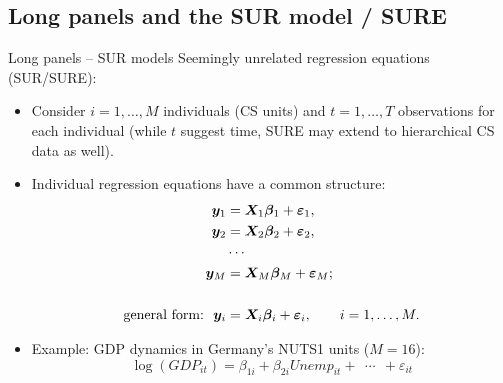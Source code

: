 \documentclass[usenames,dvipsnames]{beamer}
\begin{document}
\subsection*{Long panels and the SUR model / SURE}
\begin{frame}{Long panels -- SUR models}
\small
Seemingly unrelated regression equations (SUR/SURE):\\ \medskip
\begin{itemize}
    \item Consider $i=1,\dots,M$ individuals (CS units) and $t=1,\dots,T$ observations for each individual (while $t$ suggest time, SURE may extend to hierarchical CS data as well).\\
    \bigskip
    \item Individual regression equations have a common structure: 
    \begin{align*}
        \bm{y}_1 &= \bm{X}_1 \bm{\beta}_1 + \bm{\varepsilon}_1, \\
        \bm{y}_2 &= \bm{X}_2 \bm{\beta}_2 + \bm{\varepsilon}_2, \\
        &\cdots \\
        \bm{y}_M &= \bm{X}_M \bm{\beta}_M + \bm{\varepsilon}_M;\\
        &~ \\
        \textnormal{general form:~~} \bm{y}_i &= \bm{X}_i \bm{\beta}_i + \bm{\varepsilon}_i,\qquad i = 1,\dots,M.
    \end{align*}
    \item Example: GDP dynamics in Germany's NUTS1 units ($M=16$):
    $$\log (\textit{GDP}_{it}) = \beta_{1i} + \beta_{2i} \textit{Unemp}_{it} +~~ \cdots~~ + \varepsilon_{it}$$
    
\end{itemize}
\end{frame}
\end{document}
